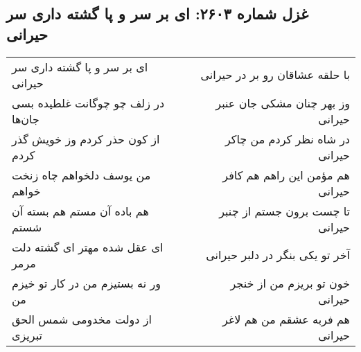 \begin{center}
\section*{غزل شماره ۲۶۰۳: ای بر سر و پا گشته داری سر حیرانی}
\label{sec:2603}
\begin{longtable}{l p{0.5cm} r}
ای بر سر و پا گشته داری سر حیرانی
&&
با حلقه عشاقان رو بر در حیرانی
\\
در زلف چو چوگانت غلطیده بسی جان‌ها
&&
وز بهر چنان مشکی جان عنبر حیرانی
\\
از کون حذر کردم وز خویش گذر کردم
&&
در شاه نظر کردم من چاکر حیرانی
\\
من یوسف دلخواهم چاه زنخت خواهم
&&
هم مؤمن این راهم هم کافر حیرانی
\\
هم باده آن مستم هم بسته آن شستم
&&
تا چست برون جستم از چنبر حیرانی
\\
ای عقل شده مهتر ای گشته دلت مرمر
&&
آخر تو یکی بنگر در دلبر حیرانی
\\
ور نه بستیزم من در کار تو خیزم من
&&
خون تو بریزم من از خنجر حیرانی
\\
از دولت مخدومی شمس الحق تبریزی
&&
هم فربه عشقم من هم لاغر حیرانی
\\
\end{longtable}
\end{center}
